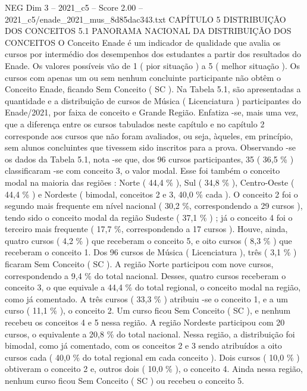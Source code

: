 \begin{textsample}{NEG Dim 3 – 2021\_c5 – Score 2.00 – 2021\_c5/enade\_2021\_mus\_8d85dac343.txt}  \label{ex:f3_neg_195}
CAPÍTULO 5 DISTRIBUIÇÃO DOS CONCEITOS 5.1 PANORAMA NACIONAL DA DISTRIBUIÇÃO DOS CONCEITOS O Conceito Enade é um indicador de qualidade que avalia os cursos por intermédio dos desempenhos dos estudantes a partir dos resultados do Enade.
Os valores possíveis vão de 1 ( pior situação ) a 5 ( melhor situação ).
Os cursos com apenas um ou sem nenhum concluinte participante não obtêm o Conceito Enade, ficando Sem Conceito ( SC ).
Na Tabela 5.1, são apresentadas a quantidade e a distribuição de cursos de Música ( Licenciatura ) participantes do Enade/2021, por faixa de conceito e Grande Região.
Enfatiza -se, mais uma vez, que a diferença entre os cursos tabulados neste capítulo e no capítulo 2 corresponde aos cursos que não foram avaliados, ou seja, àqueles, em princípio, sem alunos concluintes que tivessem sido inscritos para a prova.
Observando -se os dados da Tabela 5.1, nota -se que, dos 96 cursos participantes, 35 ( 36,5 \% ) classificaram -se com conceito 3, o valor modal.
Esse foi também o conceito modal na maioria das regiões : Norte ( 44,4 \% ), Sul ( 34,8 \% ), Centro-Oeste ( 44,4 \% ) e Nordeste ( bimodal, conceitos 2 e 3, 40,0 \% cada ).
O conceito 2 foi o segundo mais frequente em nível nacional ( 30,2 \%, correspondendo a 29 cursos ), tendo sido o conceito modal da região Sudeste ( 37,1 \% ) ; já o conceito 4 foi o terceiro mais frequente ( 17,7 \%, correspondendo a 17 cursos ).
Houve, ainda, quatro cursos ( 4,2 \% ) que receberam o conceito 5, e oito cursos ( 8,3 \% ) que receberam o conceito 1.
Dos 96 cursos de Música ( Licenciatura ), três ( 3,1 \% ) ficaram Sem Conceito ( SC ).
A região Norte participou com nove cursos, correspondendo a 9,4 \% do total nacional.
Desses, quatro cursos receberam o conceito 3, o que equivale a 44,4 \% do total regional, o conceito modal na região, como já comentado.
A três cursos ( 33,3 \% ) atribuiu -se o conceito 1, e a um curso ( 11,1 \% ), o conceito 2.
Um curso ficou Sem Conceito ( SC ), e nenhum recebeu os conceitos 4 e 5 nessa região.
A região Nordeste participou com 20 cursos, o equivalente a 20,8 \% do total nacional.
Nessa região, a distribuição foi bimodal, como já comentado, com os conceitos 2 e 3 sendo atribuídos a oito cursos cada ( 40,0 \% do total regional em cada conceito ).
Dois cursos ( 10,0 \% ) obtiveram o conceito 2 e, outros dois ( 10,0 \% ), o conceito 4.
Ainda nessa região, nenhum curso ficou Sem Conceito ( SC ) ou recebeu o conceito 5.

\end{textsample}
